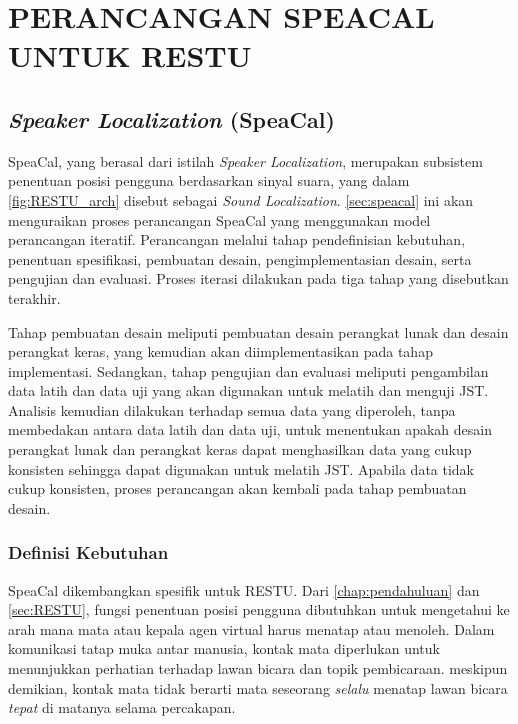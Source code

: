 \chapter{\uppercase{Perancangan SpeaCal Untuk RESTU}}
\label{chap:perancangan}



\section{\textit{Speaker Localization} (SpeaCal)}
\label{sec:speacal}

SpeaCal, yang berasal dari istilah \textit{Speaker Localization}, merupakan subsistem penentuan posisi pengguna berdasarkan sinyal suara, yang dalam \autoref{fig:RESTU_arch} disebut sebagai \textit{Sound Localization}. \autoref{sec:speacal} ini akan menguraikan proses perancangan SpeaCal yang menggunakan model perancangan iteratif. Perancangan melalui tahap pendefinisian kebutuhan, penentuan spesifikasi, pembuatan desain, pengimplementasian desain, serta pengujian dan evaluasi. Proses iterasi dilakukan pada tiga tahap yang disebutkan terakhir.

Tahap pembuatan desain meliputi pembuatan desain perangkat lunak dan desain perangkat keras, yang kemudian akan diimplementasikan pada tahap implementasi. Sedangkan, tahap pengujian dan evaluasi meliputi pengambilan data latih dan data uji yang akan digunakan untuk melatih dan menguji JST. Analisis kemudian dilakukan terhadap semua data yang diperoleh, tanpa membedakan antara data latih dan data uji, untuk menentukan apakah desain perangkat lunak dan perangkat keras dapat menghasilkan data yang cukup konsisten sehingga dapat digunakan untuk melatih JST. Apabila data tidak cukup konsisten, proses perancangan akan kembali pada tahap pembuatan desain.

\subsection{Definisi Kebutuhan}

SpeaCal dikembangkan spesifik untuk RESTU. Dari \autoref{chap:pendahuluan} dan \autoref{sec:RESTU}, fungsi penentuan posisi pengguna dibutuhkan untuk mengetahui ke arah mana mata atau kepala agen virtual harus menatap atau menoleh. Dalam komunikasi tatap muka antar manusia, kontak mata diperlukan untuk menunjukkan perhatian terhadap lawan bicara dan topik pembicaraan. meskipun demikian, kontak mata tidak berarti mata seseorang \textit{selalu} menatap lawan bicara \textit{tepat} di matanya selama percakapan.

